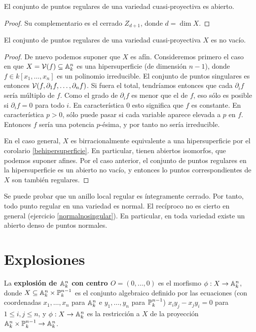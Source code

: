 \documentclass[ACGA.tex]{subfiles}
\begin{document}
\begin{coro}
 El conjunto de puntos regulares de una variedad cuasi-proyectiva es abierto.
\end{coro}

\begin{proof}
 Su complementario es el cerrado $Z_{d+1}$, donde $d=\dim X$.
\end{proof}

\begin{prop}
 El conjunto de puntos regulares de una variedad cuasi-proyectiva $X$ es no vacío.
\end{prop}

\begin{proof}
 De nuevo podemos suponer que $X$ es afín. Consideremos primero el caso en que $X=\mathcal{V}(f)\subseteq\mathbb{A}^n_k$ es una hipersuperficie (de dimensión $n-1$), donde $f\in k[x_1,\ldots,x_n]$ es un polinomio irreducible. El conjunto de puntos singulares es entonces $\mathcal{V}(f,\partial_1f,\ldots,\partial_nf)$. Si fuera el total, tendríamos entonces que cada $\partial_if$ sería múltiplo de $f$. Como el grado de $\partial_i f$ es menor que el de $f$, eso sólo es posible si $\partial_if=0$ para todo $i$. En característica $0$ esto significa que $f$ es constante. En característica $p>0$, sólo puede pasar si cada variable aparece elevada a $p$ en $f$. Entonces $f$ sería una potencia $p$-ésima, y por tanto no sería irreducible.

En el caso general, $X$ es birracionalmente equivalente a una hipersuperficie por el corolario \ref{behipersuperficie}. En particular, tienen abiertos isomorfos, que podemos suponer afines. Por el caso anterior, el conjunto de puntos regulares en la hipersuperficie es un abierto no vacío, y entonces lo puntos correspondientes de $X$ son también regulares.  
\end{proof}

Se puede probar que un anillo local regular es íntegramente cerrado. Por tanto, todo punto regular en una variedad es normal. El recíproco no es cierto en general (ejercicio \ref{normalnosingular}). En particular, en toda variedad existe un abierto denso de puntos normales.

\section{Explosiones}

\begin{defi}
 La {\bf explosión de $\mathbb{A}^n_k$ con centro $O=(0,\ldots,0)$} es el morfismo $\phi:X\to \mathbb{A}^n_k$, donde $X\subseteq \mathbb{A}^n_k\times{\mathbb{P}^{n-1}_k}$ es el conjunto algebraico definido por las ecuaciones (con coordenadas $x_1,\ldots,x_n$ para $\mathbb{A}^n_k$ e $y_1,\ldots,y_n$ para $\mathbb{P}^{n-1}_k$) $x_iy_j-x_jy_i=0$ para $1\leq i,j\leq n$, y $\phi:X\to\mathbb{A}^n_k$ es la restricción a $X$ de la proyección $\mathbb{A}^n_k\times{\mathbb{P}^{n-1}_k}\to\mathbb{A}^n_k$.
\end{defi}
\end{document}
